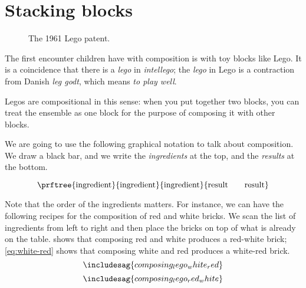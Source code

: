 

\section{Stacking blocks}


\begin{figure*}[p]
  \centering
%
  \caption{The 1961 Lego patent.}
\end{figure*}


The first encounter children have with composition is with toy blocks like Lego.
It is a coincidence that there is a \emph{lego} in \emph{intellego}; the \emph{lego} in Lego is a contraction from Danish \emph{leg godt}, which means \emph{to play well}.

Legos are compositional in this sense: when you put together two blocks, you can treat the ensemble as one block for the purpose of composing it with other blocks.

We are going to use the following graphical notation to talk about composition.
We draw a black bar, and we write the \emph{ingredients} at the top, and the \emph{results} at the bottom.

\begin{equation}
\prftree{
    \text{ingredient}
}{
    \text{ingredient}
}{
    \text{ingredient}
}{
    \text{result} \quad \quad \text{result}
}
\end{equation}

Note that the order of the ingredients matters.
For instance, we can have the following recipes for the composition of red and white bricks.
We scan the list of ingredients from left to right and then place the bricks on top of what is already on the table.
 shows that composing red and white produces a red-white brick;
\cref{eq:white-red} shows that composing white and red produces a white-red brick.
\begin{equation}\label{eq:red-white}
\includesag{composing_lego_white_red}
\end{equation}
%
\begin{equation}
  \label{eq:white-red}
\includesag{composing_lego_red_white}
\end{equation}

